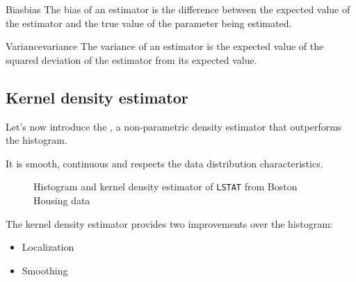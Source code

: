 \begin{definition}{Bias}{bias}
	The bias of an estimator is the difference between the expected value of the
	estimator and the true value of the parameter being estimated.
\end{definition}

\begin{definition}{Variance}{variance}
	The variance of an estimator is the expected value of the squared deviation of the
	estimator from its expected value.
\end{definition}

\subsection{Kernel density estimator}

Let's now introduce the , a non-parametric
density estimator that outperforms the histogram.

It is smooth, continuous and respects the data distribution characteristics.

\begin{figure}[H]
	\caption{Histogram and kernel density estimator of \texttt{LSTAT} from Boston Housing data}%
\end{figure}

The kernel density estimator provides two improvements over the histogram:
\begin{itemize}
	\item Localization
	\item Smoothing
\end{itemize}

